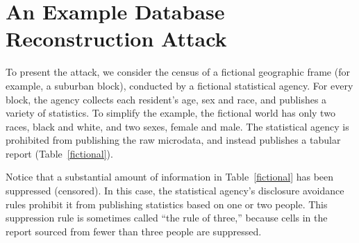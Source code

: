 \documentclass[runningheads]{llncs}
\begin{document}
\section{An Example Database Reconstruction Attack}

To present the attack, we consider the 
census of a fictional geographic frame (for example, a suburban block),
conducted by a fictional statistical
agency. For every block, the agency collects each resident's age,
sex and race, and publishes a variety of statistics. To simplify the example,
the fictional world has only two races, black and white, and two
sexes, female and male. The statistical agency
is prohibited from publishing the raw microdata, and instead publishes
a tabular report (Table~\ref{fictional}). 

Notice that a substantial amount of information in
Table~\ref{fictional} has been suppressed (censored). In this case,
the statistical agency's disclosure avoidance rules prohibit it from
publishing statistics based on one or two people. This suppression rule is
sometimes called ``the rule of three,'' because cells in the report
sourced from fewer than three people are suppressed.
\end{document}
